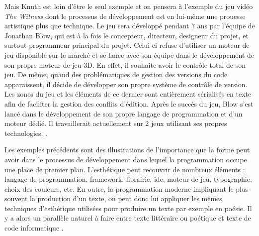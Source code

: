 \documentclass[12pt]{article} %
\begin{document}
Mais Knuth est loin d'être le seul exemple et on pensera à l'exemple du jeu vidéo \textit{The Witness} dont le processus de développement est en lui-même une prouesse artistique plus que technique. Le jeu sera développé pendant 7 ans par l'équipe de Jonathan Blow, qui est à la fois le concepteur, directeur, designeur du projet, et surtout programmeur principal du projet. Celui-ci refuse d'utiliser un moteur de jeu disponible sur le marché et se lance avec son équipe dans le développement de son propre moteur de jeu 3D. En effet, il souhaite avoir le contrôle total de son jeu. De même, quand des problématiques de gestion des versions du code apparaissent, il décide de développer son propre système de contrôle de version. Les zones du jeu et les éléments de ce dernier sont entièrement sérialisés en texte afin de faciliter la gestion des conflits d'édition. Après le succès du jeu, Blow s'est lancé dans le développement de son propre langage de programmation et d'un moteur dédié. Il travaillerait actuellement sur 2 jeux utilisant ses propres technologies. \cite{Takahashi2018-cb}.

Les exemples précédents sont des illustrations de l'importance que la forme peut avoir dans le processus de développement dans lequel la programmation occupe une place de premier plan. L'esthétique peut recouvrir de nombreux éléments : langage de programmation, framework, librairie, \acrshort{ide}, moteur de jeu, typographie, choix des couleurs, etc. En outre, la programmation moderne impliquant le plus souvent la production d'un texte, on peut donc lui appliquer les mêmes techniques d'esthétique utilisées pour produire un texte par exemple en poésie. Il y a alors un parallèle naturel à faire entre texte littéraire ou poétique et texte de code informatique \cite{FCramer2001}.
\end{document}
